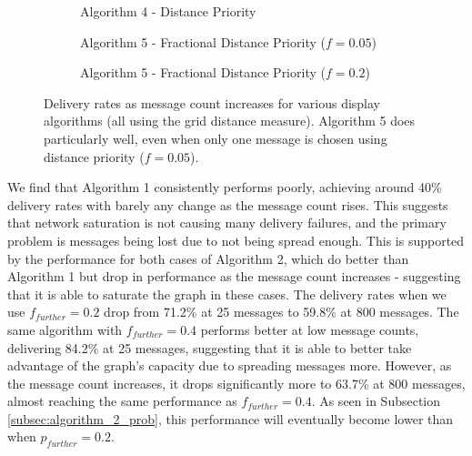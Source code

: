 \documentclass[bsc,frontabs,twoside,singlespacing,parskip,deptreport]{infthesis}     %
\begin{document}
\begin{figure}
\begin{subfigure}[t]{0.49\textwidth}
\begin{tikzpicture}
\end{tikzpicture}
\caption{Algorithm 4 - Distance Priority}
\end{subfigure}
%
\par\bigskip 
%
\begin{subfigure}[t]{0.49\textwidth}
\captionsetup{justification=centering}
\caption{Algorithm 5 - Fractional Distance Priority ($f=0.05$)}
\end{subfigure}
%
\begin{subfigure}[t]{0.49\textwidth}
\captionsetup{justification=centering}
\caption{Algorithm 5 - Fractional Distance Priority ($f=0.2$)}
\end{subfigure}
\caption{Delivery rates as message count increases for various display algorithms (all using the grid distance measure). Algorithm 5 does particularly well, even when only one message is chosen using distance priority ($f=0.05$).}
\label{fig:all_show_models}
\end{figure}

We find that Algorithm 1 consistently performs poorly, achieving around 40\% delivery rates with barely any change as the message count rises. This suggests that network saturation is not causing many delivery failures, and the primary problem is messages being lost due to not being spread enough. This is supported by the performance for both cases of Algorithm 2, which do better than Algorithm 1 but drop in performance as the message count increases - suggesting that it is able to saturate the graph in these cases. The delivery rates when we use $f_{further}=0.2$ drop from 71.2\% at 25 messages to 59.8\% at 800 messages. The same algorithm with $f_{further}=0.4$ performs better at low message counts, delivering 84.2\% at 25 messages, suggesting that it is able to better take advantage of the graph's capacity due to spreading messages more. However, as the message count increases, it drops significantly more to 63.7\% at 800 messages, almost reaching the same performance as $f_{further}=0.4$. As seen in Subsection \ref{subsec:algorithm_2_prob}, this performance will eventually become lower than when $p_{further}=0.2$.
\end{document}
